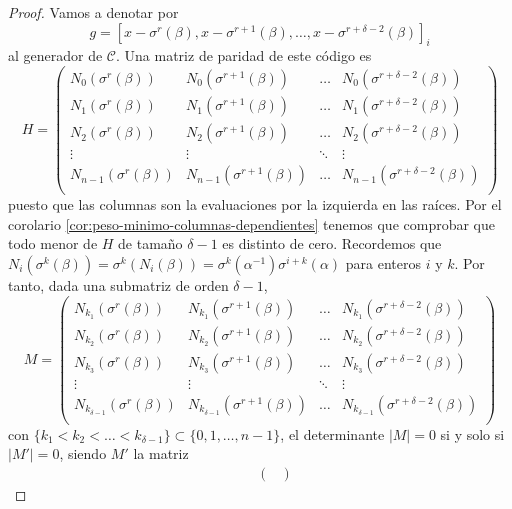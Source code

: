 \begin{proof}
  Vamos a denotar por
  \[
    g = \left[x - \sigma^r(\beta), x - \sigma^{r+1}(\beta), \dots, x - \sigma^{r+\delta-2}(\beta)\right]_i
  \]
  al generador de \(\mathcal C\).
  Una matriz de paridad de este código es
  \[
    H = \begin{pmatrix}
      N_0(\sigma^{r}(\beta)) & N_0(\sigma^{r+1}(\beta)) & \dots & N_0(\sigma^{r+\delta-2}(\beta))\\
      N_1(\sigma^{r}(\beta)) & N_1(\sigma^{r+1}(\beta)) & \dots & N_1(\sigma^{r+\delta-2}(\beta))\\
      N_2(\sigma^{r}(\beta)) & N_2(\sigma^{r+1}(\beta)) & \dots & N_2(\sigma^{r+\delta-2}(\beta))\\
      \vdots & \vdots & \ddots & \vdots \\
      N_{n-1}(\sigma^{r}(\beta)) & N_{n-1}(\sigma^{r+1}(\beta)) & \dots & N_{n-1}(\sigma^{r+\delta-2}(\beta))\\
    \end{pmatrix}
  \]
  puesto que las columnas son la evaluaciones por la izquierda en las raíces.
  Por el corolario \ref{cor:peso-minimo-columnas-dependientes} tenemos que comprobar que todo menor de \(H\) de tamaño \(\delta - 1\) es distinto de cero.
  Recordemos que \(N_i(\sigma^{k}(\beta)) = \sigma^k(N_i(\beta)) = \sigma^{k}(\alpha^{-1})\sigma^{i+k}(\alpha)\) para enteros \(i\) y \(k\).
  Por tanto, dada una submatriz de orden \(\delta - 1\),
  \[
    M = \begin{pmatrix}
      N_{k_1}(\sigma^{r}(\beta)) & N_{k_1}(\sigma^{r+1}(\beta)) & \dots & N_{k_1}(\sigma^{r+\delta-2}(\beta))\\
      N_{k_2}(\sigma^{r}(\beta)) & N_{k_2}(\sigma^{r+1}(\beta)) & \dots & N_{k_2}(\sigma^{r+\delta-2}(\beta))\\
      N_{k_3}(\sigma^{r}(\beta)) & N_{k_3}(\sigma^{r+1}(\beta)) & \dots & N_{k_3}(\sigma^{r+\delta-2}(\beta))\\
      \vdots & \vdots & \ddots & \vdots \\
      N_{k_{\delta - 1}}(\sigma^{r}(\beta)) & N_{k_{\delta - 1}}(\sigma^{r+1}(\beta)) & \dots & N_{k_{\delta - 1}}(\sigma^{r+\delta-2}(\beta))\\
    \end{pmatrix}
  \]
  con \(\{k_1 < k_2 < \dots < k_{\delta - 1}\} \subset \{0, 1, \dots, n - 1\}\),
  el determinante \(|M| = 0\) si y solo si \(|M'| = 0\), siendo \(M'\) la matriz 
  \begin{align*}
    &\phantom{={}} \begin{pmatrix}

\end{pmatrix}
\end{align*}
\end{proof}
